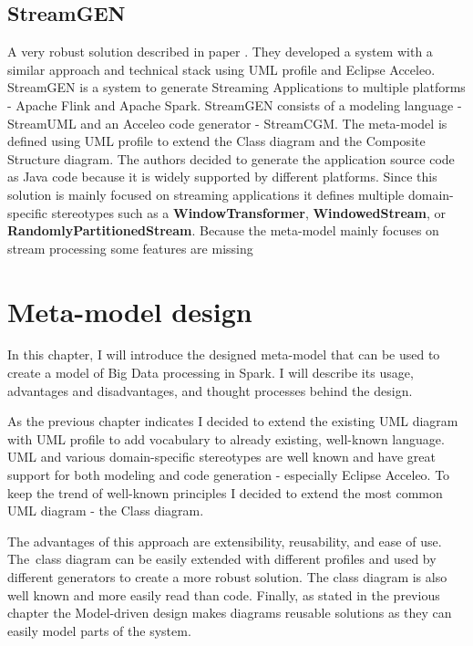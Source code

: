 \section{StreamGEN}

A very robust solution described in paper \cite{streamgen}. They developed a system with a similar approach and technical stack using UML profile and Eclipse Acceleo. StreamGEN is a system to generate Streaming Applications to multiple platforms - Apache Flink and Apache Spark. StreamGEN consists of a modeling language - StreamUML and an Acceleo code generator - StreamCGM. The meta-model is defined using UML profile to extend the Class diagram and the Composite Structure diagram. 
The authors decided to generate the application source code as Java code because it is widely supported by different platforms.  Since this solution is mainly focused on streaming applications it defines multiple domain-specific stereotypes such as a \textbf{WindowTransformer}, \textbf{WindowedStream}, or \textbf{RandomlyPartitionedStream}. Because the meta-model mainly focuses on stream processing some features are missing


\chapter{Meta-model design}
\label{chap:design}

In this chapter, I will introduce the designed meta-model that can be used to create a model of Big Data processing in Spark. I will describe its usage, advantages and disadvantages, and thought processes behind the design. 

As the previous chapter indicates I decided to extend the existing UML diagram with UML profile to add vocabulary to already existing, well-known language. UML and various domain-specific stereotypes are well known and have great support for both modeling and code generation - especially Eclipse Acceleo. 
To keep the trend of well-known principles I decided to extend the most common UML diagram - the Class diagram. 

The advantages of this approach are extensibility, reusability, and ease of use. The~class diagram can be easily extended with different profiles and used by different generators to create a more robust solution. The class diagram is also well known and more easily read than code. Finally, as stated in the previous chapter the Model-driven design makes diagrams reusable solutions as they can easily model parts of the system.

